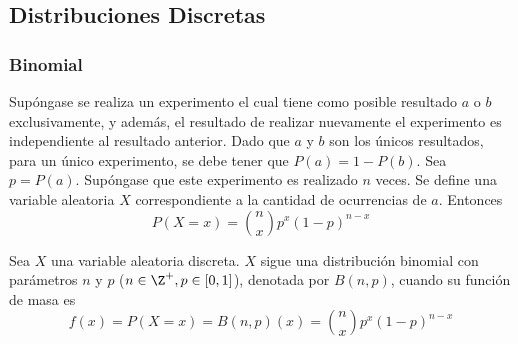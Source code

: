 \subsection{Distribuciones Discretas}
\subsubsection{Binomial}
Supóngase se realiza un experimento el cual tiene como posible
resultado $a$ o $b$ exclusivamente, y además, el resultado
de realizar nuevamente el experimento es independiente al
resultado anterior. Dado que $a$ y $b$ son los únicos resultados,
para un único experimento, se debe tener que
$P(a) = 1 - P(b)$. Sea $p=P(a)$. Supóngase que
este experimento es realizado $n$ veces. Se define una variable
aleatoria $X$ correspondiente a la cantidad de ocurrencias de $a$.
Entonces
\[P(X=x) = \binom{n}{x}p^x(1-p)^{n-x}\]  
\begin{Def}
  Sea $X$ una variable aleatoria discreta. $X$ sigue una distribución
  binomial con parámetros $n$ y $p$ ($n\in\Z^+, p\in[0,1]$), denotada por $B(n,p)$,
  cuando su función de masa es
  \[f(x) = P(X=x) = B(n,p)(x) = \binom{n}{x}p^x(1-p)^{n-x}\]
\end{Def}

